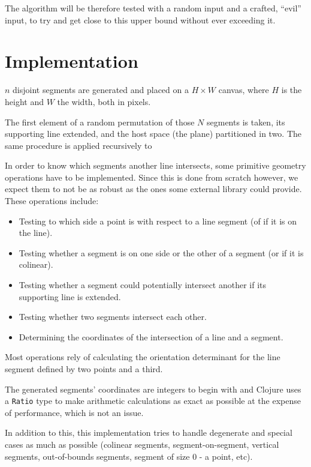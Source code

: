 \documentclass[12pt,a4paper]{article}
\begin{document}
The algorithm will be therefore tested with a random input and a
crafted, ``evil'' input, to try and get close to this upper bound
without ever exceeding it.

\section{Implementation}

$n$ disjoint segments are generated and placed on a $H\times W$
canvas, where $H$ is the height and $W$ the width, both in pixels.

The first element of a random permutation of those $N$ segments is
taken, its supporting line extended, and the host space (the plane)
partitioned in two. The same procedure is applied recursively to

In order to know which segments another line intersects, some
primitive geometry operations have to be implemented. Since this is
done from scratch however, we expect them to not be as robust as the
ones some external library could provide. These operations include:

\begin{itemize}
\item Testing to which side a point is with respect to a line segment
  (of if it is on the line).
\item Testing whether a segment is on one side or the other of a
  segment (or if it is colinear).
\item Testing whether a segment could potentially intersect another if
  its supporting line is extended.
\item Testing whether two segments intersect each other.
\item Determining the coordinates of the intersection of a line and a
  segment.
\end{itemize}

Most operations rely of calculating the orientation determinant for
the line segment defined by two points and a third.

The generated segments' coordinates are integers to begin with and
Clojure uses a \texttt{Ratio} type to make arithmetic calculations as
exact as possible at the expense of performance, which is not an
issue.

In addition to this, this implementation tries to handle degenerate
and special cases as much as possible (colinear segments,
segment-on-segment, vertical segments, out-of-bounds segments, segment
of size 0 - a point, etc).
\end{document}
